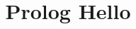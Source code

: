 \documentclass[12pt,titlepage]{report}
\begin{document}


\pagestyle{fancy}
\renewcommand{\sectionmark}[1]{\markboth{}{\thesection\ \ #1}}
\lhead{}
\chead{}
\rhead{\rightmark}
\lfoot{}
\cfoot{}
\rfoot{\thepage}



\title{Prolog Hello}
\author{}


\end{document}
